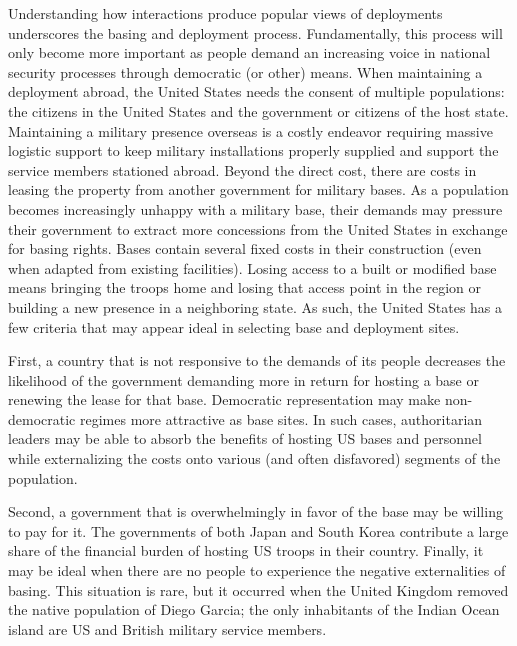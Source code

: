 Understanding how interactions produce popular views of deployments underscores the basing and deployment process. Fundamentally, this process will only become more important as people demand an increasing voice in national security processes through democratic (or other) means. When maintaining a deployment abroad, the United States needs the consent of multiple populations: the citizens in the United States and the government or citizens of the host state. Maintaining a military presence overseas is a costly endeavor requiring massive logistic support to keep military installations properly supplied and support the service members stationed abroad. Beyond the direct cost, there are costs in leasing the property from another government for military bases. As a population becomes increasingly unhappy with a military base, their demands may pressure their government to extract more concessions from the United States in exchange for basing rights. Bases contain several fixed costs in their construction (even when adapted from existing facilities). Losing access to a built or modified base means bringing the troops home and losing that access point in the region or building a new presence in a neighboring state. As such, the United States has a few criteria that may appear ideal in selecting base and deployment sites. 

First, a country that is not responsive to the demands of its people decreases the likelihood of the government demanding more in return for hosting a base or renewing the lease for that base. Democratic representation may make non-democratic regimes more attractive as base sites.\autocite{Allen2011} In such cases, authoritarian leaders may be able to absorb the benefits of hosting US bases and personnel while externalizing the costs onto various (and often disfavored) segments of the population.

Second, a government that is overwhelmingly in favor of the base may be willing to pay for it. The governments of both Japan  and South Korea  contribute a large share of the financial burden of hosting US troops in their country. Finally, it may be ideal when there are no people to experience the negative externalities of basing. This situation is rare, but it occurred when the United Kingdom removed the native population of Diego Garcia; the only inhabitants of the Indian Ocean island are US and British military service members.\autocite{Johnson2004,Vine2004,vinejeffery2009} 

